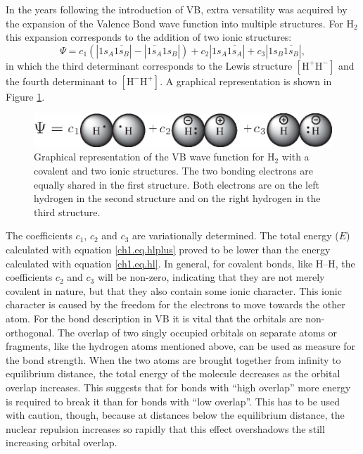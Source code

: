 In the years following the introduction of VB, extra versatility was acquired by the expansion of the Valence Bond wave function into multiple structures. For H$_2$ this expansion corresponds to the addition of two ionic structures:
\begin{equation}
\Psi = c_1 (|1s_{A}\overline{1s_{B}}| - |\overline{1s_{A}}1s_{B}|) + c_2 |1s_{A}\overline{1s_{A}}| + c_3 |1s_{B}\overline{1s_{B}}|,
\label{ch1.eq.hlplus}
\end{equation}
in which the third determinant corresponds to the Lewis structure $\mathrm{[H^{+} H^{-}]}$ and the fourth determinant to $\mathrm{[H^{-} H^{+}]}$. A graphical representation is shown in Figure \ref{ch1.fig.heitlerplus}.
\begin{figure}[htdp]
\center
\includegraphics[scale=1]{introduction/figures/heitlerplus.eps}
\caption{Graphical representation of the VB wave function for $\mathrm{H_2}$ with a covalent and two ionic structures. The two bonding electrons are equally shared in the first structure. Both electrons are on the left hydrogen in the second structure and on the right hydrogen in the third structure.}
\label{ch1.fig.heitlerplus}   
\end{figure}
The coefficients $c_1$, $c_2$ and $c_3$ are variationally determined. The total energy ($E$) calculated with equation \ref{ch1.eq.hlplus} proved to be lower than the energy calculated with equation \ref{ch1.eq.hl}. In general, for covalent bonds, like H--H, the coefficients $c_2$ and $c_3$ will be non-zero, indicating that they are not merely covalent in nature, but that they also contain some ionic character. This ionic character is caused by the freedom for the electrons to move towards the other atom. For the bond description in VB it is vital that the orbitals are non-orthogonal. The overlap of two singly occupied orbitals on separate atoms or fragments, like the hydrogen atoms mentioned above, can be used as measure for the bond strength. When the two atoms are brought together from infinity to equilibrium distance, the total energy of the molecule decreases as the orbital overlap increases. This suggests that for bonds with ``high overlap'' more energy is required to break it than for bonds with ``low overlap''. This has to be used with caution, though, because at distances below the equilibrium distance, the nuclear repulsion increases so rapidly that this effect overshadows the still increasing orbital overlap.

